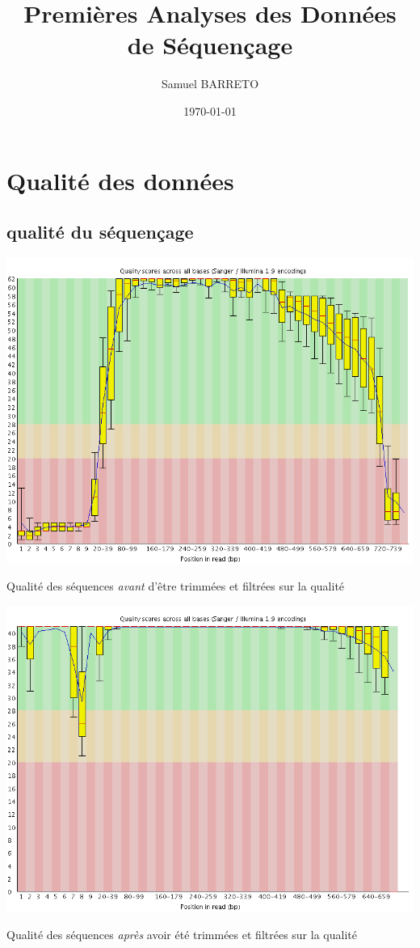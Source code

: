 \documentclass[a4paper]{tufte-handout}
\author{Samuel BARRETO}
\date{\today}
\title{Premières Analyses des Données de Séquençage}
\begin{document}
\maketitle

\section{Qualité des données}
\label{sec:orgheadline4}
\subsection{qualité du séquençage}
\label{sec:orgheadline1}
\begin{marginfigure}
  \includegraphics[width=\linewidth]{../per_base_quality_fastqc_untrimmed.png}
  \caption{Qualité des séquences \emph{avant} d'être trimmées et filtrées
      sur la qualité}
\end{marginfigure}

\begin{marginfigure}
  \includegraphics[width=\linewidth]{../per_base_quality_fastqc_trimmed.png}
  \caption{Qualité des séquences \emph{après} avoir été trimmées et filtrées
      sur la qualité}
\end{marginfigure}
\end{document}
